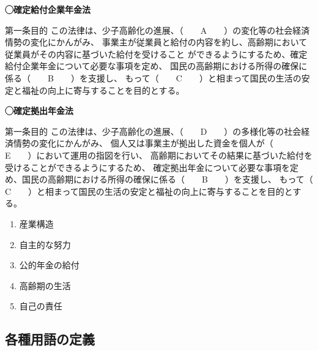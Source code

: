 \begin{fillblank}[年金1 \ H27 \ 問題1(2)]

  
  \noindent \textbf{◯確定給付企業年金法}
  \begin{lawstructure}
    \begin{lawarticle}{第一条}{目的}
      この法律は、少子高齢化の進展、（　　A　　）の変化等の社会経済情勢の変化にかんがみ、
      事業主が従業員と給付の内容を約し、高齢期において従業員がその内容に基づいた給付を受けること
      ができるようにするため、確定給付企業年金について必要な事項を定め、
      国民の高齢期における所得の確保に係る（　　B　　）を支援し、
      もって（　　C　　）と相まって国民の生活の安定と福祉の向上に寄与することを目的とする。
    \end{lawarticle}
  \end{lawstructure}

      
  \noindent \textbf{◯確定拠出年金法}
  \begin{lawstructure}
    \begin{lawarticle}{第一条}{目的}
      この法律は、少子高齢化の進展、（　　D　　）の多様化等の社会経済情勢の変化にかんがみ、
      個人又は事業主が拠出した資金を個人が（　　E　　）において運用の指図を行い、
      高齢期においてその結果に基づいた給付を受けることができるようにするため、
      確定拠出年金について必要な事項を定め、国民の高齢期における所得の確保に係る（　　B　　）を支援し、
      もって（　　C　　）と相まって国民の生活の安定と福祉の向上に寄与することを目的とする。
    \end{lawarticle}
  \end{lawstructure}

\end{fillblank}

\begin{answerbox}
 \begin{enumerate}[A:]
    \item 産業構造
    \item 自主的な努力
    \item 公的年金の給付
    \item 高齢期の生活
    \item 自己の責任
  \end{enumerate}
\end{answerbox}

\newpage

\subsection{各種用語の定義}

